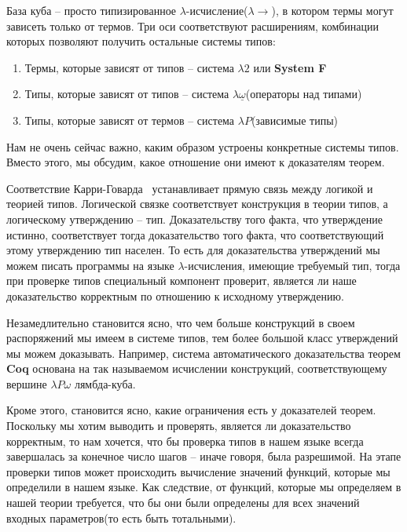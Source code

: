 
База куба -- просто типизированное $\lambda$-исчисление($\lambda{\to}$), в котором термы могут зависеть только от термов. Три оси соответствуют расширениям, комбинации которых позволяют получить остальные системы типов:

\begin{enumerate}
  \item Термы, которые зависят от типов -- система $\lambda2$ или \textbf{System F}
  \item Типы, которые зависят от типов -- система $\lambda \underline{\omega}$(операторы над типами)
  \item Типы, которые зависят от термов -- система $\lambda P$(зависимые типы)
\end{enumerate}

Нам не очень сейчас важно, каким образом устроены конкретные системы типов. Вместо этого, мы обсудим, какое отношение они имеют к доказателям теорем.

Соответствие Карри-Говарда~\cite{howard1980formulae} устанавливает прямую связь между логикой и теорией типов. Логической связке соответствует конструкция в теории типов, а логическому утверждению -- тип. Доказательству того факта, что утверждение истинно, соответствует тогда доказательство того факта, что соответствующий этому утверждению тип населен. То есть для доказательства утверждений мы можем писать программы на языке $\lambda$-исчисления, имеющие требуемый тип, тогда при проверке типов специальный компонент проверит, является ли наше доказательство корректным по отношению к исходному утверждению.

Незамедлительно становится ясно, что чем больше конструкций в своем распоряжений мы имеем в системе типов, тем более большой класс утверждений мы можем доказывать. Например, система автоматического доказательства теорем \textbf{Coq} основана на так называемом исчислении конструкций, соответствующему вершине $\lambda{}P{}\omega$ лямбда-куба.

Кроме этого, становится ясно, какие ограничения есть у доказателей теорем. Поскольку мы хотим выводить и проверять, является ли доказательство корректным, то нам хочется, что бы проверка типов в нашем языке всегда завершалась за конечное число шагов -- иначе говоря, была разрешимой. На этапе проверки типов может происходить вычисление значений функций, которые мы определили в нашем языке. Как следствие, от функций, которые мы определяем в нашей теории требуется, что бы они были определены для всех значений входных параметров(то есть быть тотальными).
